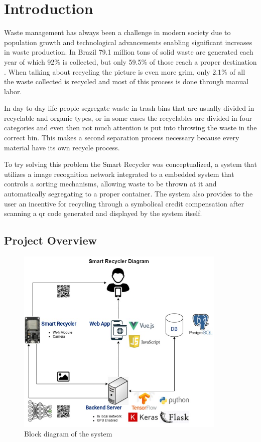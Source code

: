 \documentclass[a4paper,11pt]{article}
\begin{document}
\section{Introduction}
\label{sec:intro}
\noindent

Waste management has always been a challenge in modern society due to population growth and technological advancements enabling significant incre\-ases in waste production. In Brazil 79.1 million tons of solid waste are generated each year \cite{Senado} of which 92\% is collected, but only 59.5\% of those reach a proper destination \cite{Senado}. When talking about recycling the picture is even more grim, only 2.1\% of all the waste collected is recycled \cite{Poder360} and most of this process is done through manual labor.

In day to day life people segregate waste in trash bins that are usually divided in recyclable and organic types, or in some cases the recyclables are divided in four categories and even then not much attention is put into throwing the waste in the correct bin. This makes a second separation process necessary because every material have its own recycle process.

To try solving this problem the Smart Recycler was conceptualized, a system that utilizes a image recognition network integrated to a embedded system that controls a sorting mechanisms, allowing waste to be thrown at it and automatically segregating to a proper container. The system also provides to the user an incentive for recycling through a symbolical credit compensation after scanning a qr code generated and displayed  by the system itself.

\subsection{Project Overview}
\label{subsec:overview}

\begin{figure}[H]
  \centering
  \includegraphics[width=10cm]{Figures/Smart Recycler Diagram.png}
  \caption{\small{Block diagram of the system}}
  \label{fig:blockDiagram}
\end{figure}
\end{document}
